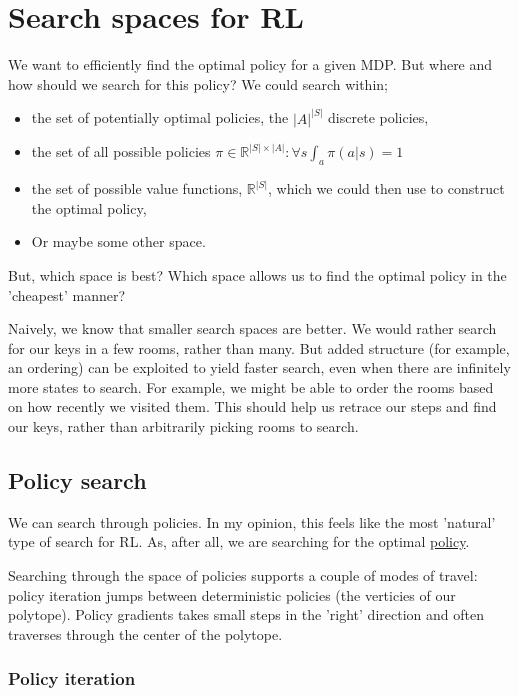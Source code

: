 \section{Search spaces for RL}

We want to efficiently find the optimal policy for a given MDP. But where and how should we
search for this policy? We could search within;

\begin{itemize}
\tightlist
  \item the set of potentially optimal policies, the $|A|^{|S|}$ discrete policies,
  \item the set of all possible policies $\pi \in \mathbb R^{|S| \times |A|}: \forall s \int_a \pi(a|s) = 1$
  \item the set of possible value functions, $\mathbb R^{|S|}$, which we could then use to construct the optimal policy,
  \item Or maybe some other space.
\end{itemize}
But, which space is best? Which space allows us to find the optimal policy in the 'cheapest' manner?

Naively, we know that smaller search spaces are better. We would rather
search for our keys in a few rooms, rather than many. But added
structure (for example, an ordering) can be exploited to yield faster
search, even when there are infinitely more states to search. For example,
we might be able to order the rooms based on how recently we visited them.
This should help us retrace our steps and find our keys, rather than arbitrarily
picking rooms to search.

\subsection{Policy search}

We can search through policies. In my opinion, this feels like the most 'natural' type of search for RL.
As, after all, we are searching for the optimal \underline{policy}.

Searching through the space of policies supports a couple of modes of travel:
policy iteration jumps between deterministic policies (the verticies of our polytope).
Policy gradients takes small steps in the 'right' direction and often traverses through the center of the polytope.

\subsubsection{Policy iteration}

